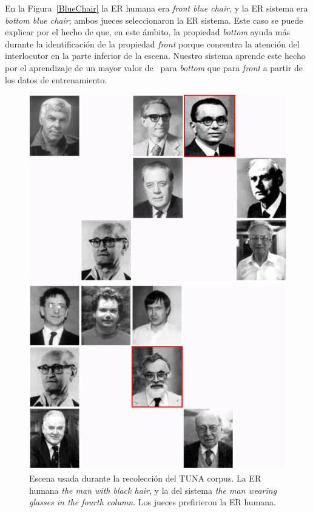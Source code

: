 En la Figura~\ref{BlueChair} la ER humana era {\it front blue chair}, y la ER sistema era {\it bottom blue chair}; ambos jueces seleccionaron la ER sistema. Este caso se puede explicar por el hecho de que, en este \'ambito, la propiedad {\it bottom} ayuda m\'as durante la identificaci\'on de la propiedad {\it front} porque concentra la atenci\'on del interlocutor en la parte inferior de la escena. Nuestro sistema aprende este hecho por el aprendizaje de un mayor valor de \puse\ para {\it bottom} que para {\it front} a partir de los datos de entrenamiento.

\begin{figure}[h]
\begin{minipage}{0.48\linewidth}
\centering
\includegraphics[width=\textwidth]{images/s59t26.jpg}
\caption{Escena usada durante la recolecci\'on del TUNA corpus. La ER humana \emph{the man with black hair}, y la del sistema \emph{the man wearing glasses in the fourth column}. Los jueces prefirieron la ER humana.}
\label{s28t25}
\end{minipage}
\hspace*{.04cm}
\begin{minipage}{0.48\linewidth}
\centering
\includegraphics[width=\textwidth]{images/s315t21.jpg}

\end{minipage}
\end{figure}
